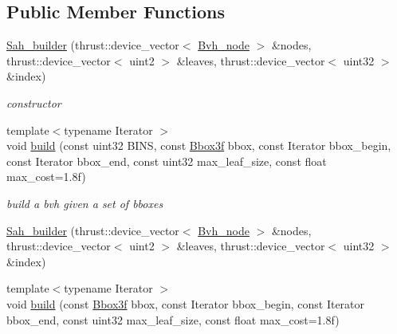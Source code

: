 \subsection*{\-Public \-Member \-Functions}
\begin{DoxyCompactItemize}
\item 
\hypertarget{structnih_1_1cuda_1_1_sah__builder_a90fd3637d56da31fcb25f5acae69e12f}{
\hyperlink{structnih_1_1cuda_1_1_sah__builder_a90fd3637d56da31fcb25f5acae69e12f}{\-Sah\-\_\-builder} (thrust\-::device\-\_\-vector$<$ \hyperlink{structnih_1_1_bvh__node}{\-Bvh\-\_\-node} $>$ \&nodes, thrust\-::device\-\_\-vector$<$ uint2 $>$ \&leaves, thrust\-::device\-\_\-vector$<$ uint32 $>$ \&index)}
\label{structnih_1_1cuda_1_1_sah__builder_a90fd3637d56da31fcb25f5acae69e12f}

\begin{DoxyCompactList}\small\item\em constructor \end{DoxyCompactList}\item 
\hypertarget{structnih_1_1cuda_1_1_sah__builder_a3530e18ffbe8e00d6e2835eb399f375e}{
{\footnotesize template$<$typename Iterator $>$ }\\void \hyperlink{structnih_1_1cuda_1_1_sah__builder_a3530e18ffbe8e00d6e2835eb399f375e}{build} (const uint32 \-B\-I\-N\-S, const \hyperlink{structnih_1_1_bbox}{\-Bbox3f} bbox, const \-Iterator bbox\-\_\-begin, const \-Iterator bbox\-\_\-end, const uint32 max\-\_\-leaf\-\_\-size, const float max\-\_\-cost=1.\-8f)}
\label{structnih_1_1cuda_1_1_sah__builder_a3530e18ffbe8e00d6e2835eb399f375e}

\begin{DoxyCompactList}\small\item\em build a bvh given a set of bboxes \end{DoxyCompactList}\item 
\hyperlink{structnih_1_1cuda_1_1_sah__builder_a90fd3637d56da31fcb25f5acae69e12f}{\-Sah\-\_\-builder} (thrust\-::device\-\_\-vector$<$ \hyperlink{structnih_1_1_bvh__node}{\-Bvh\-\_\-node} $>$ \&nodes, thrust\-::device\-\_\-vector$<$ uint2 $>$ \&leaves, thrust\-::device\-\_\-vector$<$ uint32 $>$ \&index)
\item 
{\footnotesize template$<$typename Iterator $>$ }\\void \hyperlink{structnih_1_1cuda_1_1_sah__builder_a2d77a187b3d6f0d7a0a3fc7f3c0897a0}{build} (const \hyperlink{structnih_1_1_bbox}{\-Bbox3f} bbox, const \-Iterator bbox\-\_\-begin, const \-Iterator bbox\-\_\-end, const uint32 max\-\_\-leaf\-\_\-size, const float max\-\_\-cost=1.\-8f)
\end{DoxyCompactItemize}
